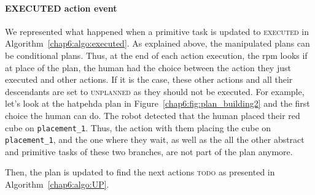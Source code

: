 \documentclass[a4paper,11pt,twoside]{StyleThese}
\begin{document}
\thispagestyle{example}
\paragraph{EXECUTED action event}
We represented what happened when a primitive task is updated to \textsc{executed} in Algorithm~\ref{chap6:algo:executed}. As explained above, the manipulated plans can be conditional plans. Thus, at the end of each action execution, the \acrshort{rpm} looks if at place of the plan, the human had the choice between the action they just executed and other actions. If it is the case, these other actions and all their descendants are set to \textsc{unplanned} as they should not be executed. For example, let's look at the \acrshort{hatpehda} plan in Figure~\ref{chap6:fig:plan_building2} and the first choice the human can do. The robot detected that the human placed their red cube on \verb'placement_1'. Thus, the action with them placing the cube on  \verb'placement_1', and the one where they wait, as well as the all the other abstract and primitive tasks of these two branches, are not part of the plan anymore. 

\thispagestyle{example}
Then, the plan is updated to find the next actions \textsc{todo} as presented in Algorithm~\ref{chap6:algo:UP}.
\end{document}

